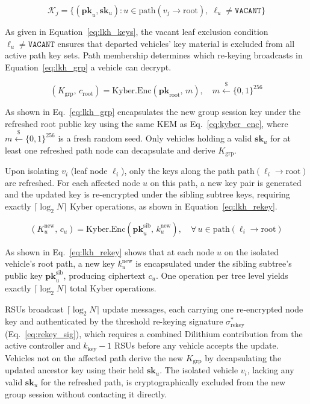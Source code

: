 \documentclass[12pt, a4paper]{report}
\begin{document}
\begin{equation}
\label{eq:lkh_keys}
\mathcal{K}_j =
\bigl\{(\mathbf{pk}_u, \mathbf{sk}_u) :
u \in \mathrm{path}(v_j \to \mathrm{root}),\;
\ell_u \neq \texttt{VACANT}
\bigr\}
\end{equation}

As given in Equation~\eqref{eq:lkh_keys}, the vacant leaf
exclusion condition $\ell_u \neq \texttt{VACANT}$ ensures that
departed vehicles' key material is excluded from all active path
key sets. Path membership determines which re-keying broadcasts
in Equation~\eqref{eq:lkh_grp} a vehicle can decrypt.

\begin{equation}
\label{eq:lkh_grp}
(K_{\text{grp}},\, c_{\mathrm{root}}) =
\mathrm{Kyber.Enc}(\mathbf{pk}_{\mathrm{root}},\, m),
\quad m \xleftarrow{\$} \{0,1\}^{256}
\end{equation}

As shown in Eq.~\eqref{eq:lkh_grp} encapsulates the new group session key under 
the refreshed root public key using the same KEM as 
Eq.~\eqref{eq:kyber_enc}, where $m \xleftarrow{\$} \{0,1\}^{256}$ 
is a fresh random seed. Only vehicles holding a valid $\mathbf{sk}_u$ 
for at least one refreshed path node can decapsulate and derive 
$K_{\mathrm{grp}}$.

Upon isolating $v_i$ (leaf node $\ell_i$), only the keys along
the path $\mathrm{path}(\ell_i \to \mathrm{root})$ are refreshed.
For each affected node $u$ on this path, a new key pair is generated
and the updated key is re-encrypted under the sibling subtree keys,
requiring exactly $\lceil \log_2 N \rceil$ Kyber operations, as shown in Equation~\eqref{eq:lkh_rekey}.

\begin{equation}
\label{eq:lkh_rekey}
(K_u^{\mathrm{new}},\, c_u) =
\mathrm{Kyber.Enc}(\mathbf{pk}_{u}^{\mathrm{sib}},\, k_u^{\mathrm{new}}),
\quad \forall\, u \in \mathrm{path}(\ell_i \to \mathrm{root})
\end{equation}

As shown in Eq.~\eqref{eq:lkh_rekey} shows that at each node $u$ on the isolated 
vehicle's root path, a new key $k_u^{\mathrm{new}}$ is encapsulated 
under the sibling subtree's public key $\mathbf{pk}_u^{\mathrm{sib}}$, 
producing ciphertext $c_u$. One operation per tree level yields 
exactly $\lceil \log_2 N \rceil$ total Kyber operations.

RSUs broadcast $\lceil \log_2 N \rceil$ update messages, each carrying
one re-encrypted node key and authenticated by the threshold re-keying
signature $\sigma_{\text{rekey}}^*$ (Eq.~\eqref{eq:rekey_sig}), which
requires a combined Dilithium contribution from the active controller
and $k_{\text{key}}-1$ RSUs before any vehicle accepts the update. Vehicles not on the affected path
derive the new $K_{\text{grp}}$ by decapsulating the updated ancestor
key using their held $\mathbf{sk}_u$. The isolated vehicle $v_i$,
lacking any valid $\mathbf{sk}_u$ for the refreshed path, is
cryptographically excluded from the new group session without
contacting it directly.
\end{document}
